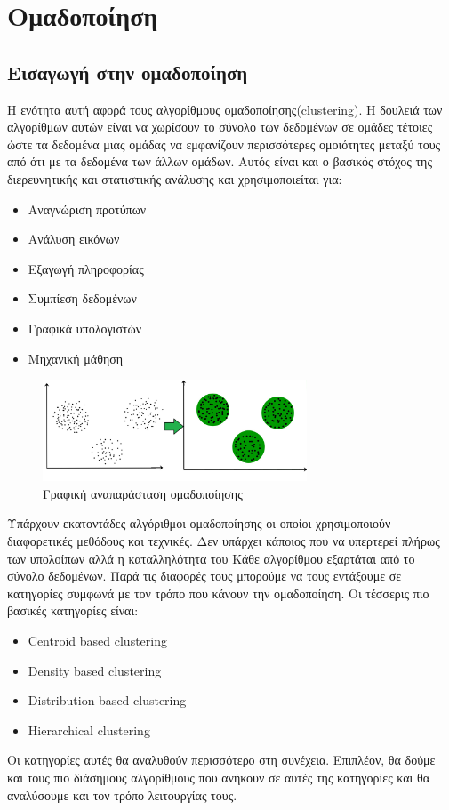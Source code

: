 \newpage
\section{Ομαδοποίηση}
\subsection{Εισαγωγή στην ομαδοποίηση}
Η ενότητα αυτή αφορά τους αλγορίθμους ομαδοποίησης(\textlatin{clustering}). Η δουλειά των
αλγορίθμων αυτών είναι να χωρίσουν το σύνολο των δεδομένων σε ομάδες τέτοιες ώστε τα δεδομένα μιας
ομάδας να εμφανίζουν περισσότερες ομοιότητες μεταξύ τους από ότι με τα δεδομένα των άλλων ομάδων.
Αυτός είναι και ο βασικός στόχος της διερευνητικής και στατιστικής ανάλυσης και χρησιμοποιείται
για\cite{wikicl}:
\begin{itemize}
    \item Αναγνώριση προτύπων
    \item Ανάλυση εικόνων
    \item Εξαγωγή πληροφορίας
    \item Συμπίεση δεδομένων
    \item Γραφικά υπολογιστών
    \item Μηχανική μάθηση
\end{itemize}
\begin{figure}[H]
    \centering
    \includegraphics[width=0.7\textwidth]{images/clustering_intro.jpg}
    \caption{Γραφική αναπαράσταση ομαδοποίησης}
\end{figure}
\sloppy
Υπάρχουν εκατοντάδες αλγόριθμοι ομαδοποίησης οι οποίοι χρησιμοποιούν διαφορετικές μεθόδους και
τεχνικές. Δεν υπάρχει κάποιος που να υπερτερεί πλήρως των υπολοίπων αλλά η καταλληλότητα του Κάθε
αλγορίθμου εξαρτάται από το σύνολο δεδομένων. Παρά τις διαφορές τους μπορούμε να τους εντάξουμε σε
κατηγορίες συμφωνά με τον τρόπο που κάνουν την ομαδοποίηση. Οι τέσσερις πιο βασικές κατηγορίες
είναι:
\fussy
\begin{itemize}
    \item \textlatin{Centroid based clustering}
    \item \textlatin{Density based clustering}
    \item \textlatin{Distribution based clustering}
    \item \textlatin{Hierarchical clustering}
\end{itemize}
Οι κατηγορίες αυτές θα αναλυθούν περισσότερο στη συνέχεια. Επιπλέον, θα δούμε και τους πιο διάσημους αλγορίθμους που ανήκουν σε αυτές της κατηγορίες και θα αναλύσουμε και τον τρόπο
λειτουργίας τους.

